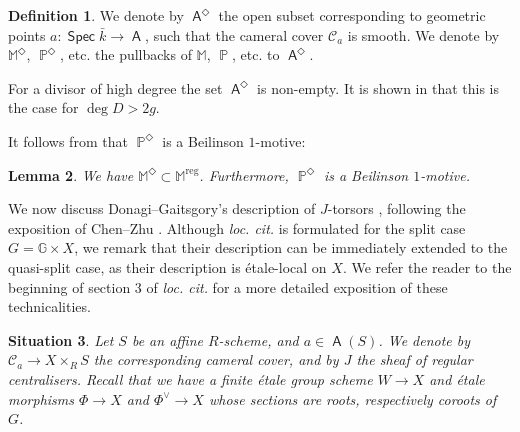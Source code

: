\documentclass{article}
\DeclareMathOperator{\reg}{reg}
\DeclareMathOperator{\A}{\mathsf{A}}
\newcommand{\Cc}{\mathcal{C}}
\newcommand{\Gb}{\mathbb{G}}
\DeclareMathOperator{\Pb}{\mathbb{P}}
\DeclareMathOperator{\Spec}{\mathsf{Spec}}
\theoremstyle{definition}
\newtheorem{definition}{Definition}[section]
\theoremstyle{plain}
\newtheorem{lemma}[definition]{Lemma}
\newtheorem{situation}[definition]{Situation}
\begin{document}
\begin{definition}\label{lemma:Agood}
We denote by $\A^{\Diamond}$ the open subset corresponding to geometric points $a\colon \Spec \bar{k} \to \A$, such that the cameral cover $\Cc_a$ is smooth. We denote by $\mathbb{M}^\Diamond$, $\Pb^\Diamond$, etc. the pullbacks of $\mathbb{M}$, $\Pb$, etc. to $\A^\Diamond$.
\end{definition}

For a divisor of high degree the set $\A^\Diamond$ is non-empty. It is shown in \cite[Proposition 4.7.1]{MR2653248} that this is the case for $\deg D > 2g$.

It follows from \cite[Proposition 4.7.7]{MR2653248} that $\Pb^{\Diamond}$ is a Beilinson $1$-motive:

\begin{lemma}\label{lemma:B1}
We have $\mathbb{M}^{\Diamond} \subset \mathbb{M}^{\reg}$. Furthermore, $\Pb^{\Diamond}$ is a Beilinson $1$-motive.
\end{lemma}

We now discuss Donagi--Gaitsgory's description of $J$-torsors \cite{MR1903115}, following the exposition of Chen--Zhu \cite[Section 3]{chenzhu}. Although \emph{loc. cit.} is formulated for the split case $G = \Gb \times X$, we remark that their description can be immediately extended to the quasi-split case, as their description is \'etale-local on $X$. We refer the reader to the beginning of section 3 of \emph{loc. cit.} for a more detailed exposition of these technicalities.


\begin{situation}\label{situation:donagi-gaitsgory}
Let $S$ be an affine $R$-scheme, and $a \in \A(S)$. We denote by $\Cc_a \to X \times_R S$ the corresponding cameral cover, and by $J$ the sheaf of regular centralisers. Recall that we have a finite \'etale group scheme $W \to X$ and \'etale morphisms $\Phi \to X$ and $\Phi^{\vee} \to X$ whose sections are roots, respectively coroots of $G$. 
\end{situation}
\end{document}
